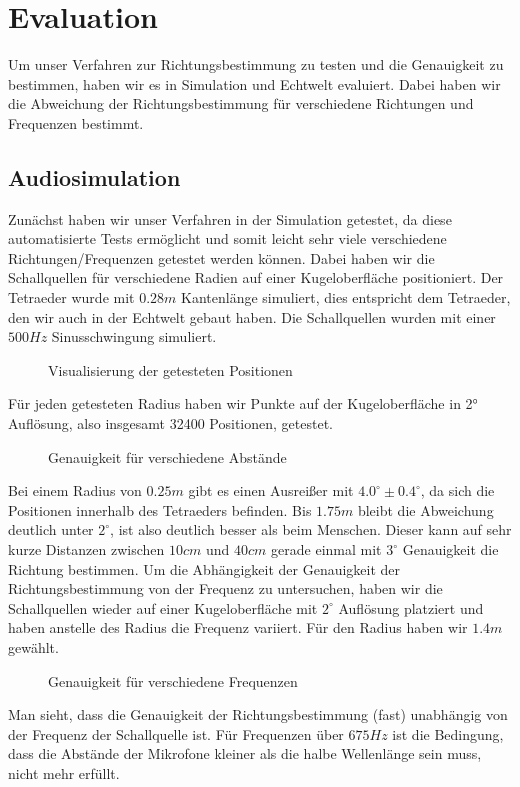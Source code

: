 \section{Evaluation}
Um unser Verfahren zur Richtungsbestimmung zu testen und die Genauigkeit zu bestimmen, haben wir es in Simulation und Echtwelt evaluiert. Dabei haben wir die Abweichung der Richtungsbestimmung für verschiedene Richtungen und Frequenzen bestimmt.
\subsection{Audiosimulation}
Zunächst haben wir unser Verfahren in der Simulation getestet, da diese automatisierte Tests ermöglicht und somit leicht sehr viele verschiedene Richtungen/Frequenzen getestet werden können. Dabei haben wir die Schallquellen für verschiedene Radien auf einer Kugeloberfläche positioniert. Der Tetraeder wurde mit $0.28m$ Kantenlänge simuliert, dies entspricht dem Tetraeder, den wir auch in der Echtwelt gebaut haben. Die Schallquellen wurden mit einer $500Hz$ Sinusschwingung simuliert.
\begin{figure}[H]
  \centering
  
  \caption{Visualisierung der getesteten Positionen}
  \label{fig:pos}
\end{figure}
Für jeden getesteten Radius haben wir Punkte auf der Kugeloberfläche in 2° Auflösung, also insgesamt 32400 Positionen, getestet.
\begin{figure}[H]
  \centering
  
  \caption{Genauigkeit für verschiedene Abstände}
  \label{fig:pos_sweep}
\end{figure}
Bei einem Radius von $0.25m$ gibt es einen Ausreißer mit $4.0^\circ \pm 0.4^\circ$, da sich die Positionen innerhalb des Tetraeders befinden. Bis $1.75m$ bleibt die Abweichung deutlich unter $2^\circ$, ist also deutlich besser als beim Menschen. Dieser kann auf sehr kurze Distanzen zwischen $10cm$ und $40cm$ gerade einmal mit $3^\circ$ Genauigkeit die Richtung bestimmen. \cite{middlebrooks1991sound}
Um die Abhängigkeit der Genauigkeit der Richtungsbestimmung von der Frequenz zu untersuchen, haben wir die Schallquellen wieder auf einer Kugeloberfläche mit $2^\circ$ Auflösung platziert und haben anstelle des Radius die Frequenz variiert. Für den Radius haben wir $1.4m$ gewählt.
\begin{figure}[H]
  \centering
  
  \caption{Genauigkeit für verschiedene Frequenzen}
  \label{fig:freq_seep}
\end{figure}
Man sieht, dass die Genauigkeit der Richtungsbestimmung (fast) unabhängig von der Frequenz der Schallquelle ist. Für Frequenzen über $675Hz$ ist die Bedingung, dass die Abstände der Mikrofone kleiner als die halbe Wellenlänge sein muss, nicht mehr erfüllt.
